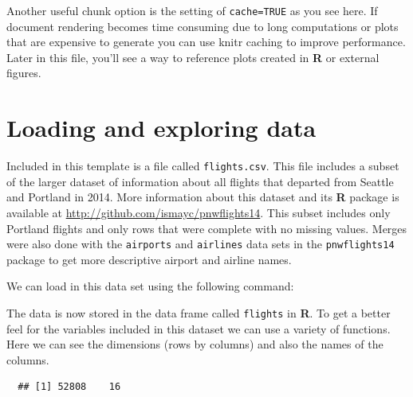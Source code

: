 \documentclass[12pt,twoside]{reedthesis}
\theoremstyle{definition}
\theoremstyle{definition}
\theoremstyle{remark}
\begin{document}
  Another useful chunk option is the setting of \texttt{cache=TRUE} as you
  see here. If document rendering becomes time consuming due to long
  computations or plots that are expensive to generate you can use knitr
  caching to improve performance. Later in this file, you'll see a way to
  reference plots created in \textbf{R} or external figures.
  
  \hypertarget{loading-and-exploring-data}{\section{Loading and exploring
  data}\label{loading-and-exploring-data}}
  
  Included in this template is a file called \texttt{flights.csv}. This
  file includes a subset of the larger dataset of information about all
  flights that departed from Seattle and Portland in 2014. More
  information about this dataset and its \textbf{R} package is available
  at \url{http://github.com/ismayc/pnwflights14}. This subset includes
  only Portland flights and only rows that were complete with no missing
  values. Merges were also done with the \texttt{airports} and
  \texttt{airlines} data sets in the \texttt{pnwflights14} package to get
  more descriptive airport and airline names.
  
  We can load in this data set using the following command:
  
  \begin{Shaded}
  \begin{Highlighting}[]
  \StringTok{ }\NormalTok{(}\NormalTok{)}
  \end{Highlighting}
  \end{Shaded}
  
  The data is now stored in the data frame called \texttt{flights} in
  \textbf{R}. To get a better feel for the variables included in this
  dataset we can use a variety of functions. Here we can see the
  dimensions (rows by columns) and also the names of the columns.
  
  \begin{Shaded}
  \begin{Highlighting}[]
  \end{Highlighting}
  \end{Shaded}
  
  \begin{verbatim}
  ## [1] 52808    16
  \end{verbatim}
  
\end{document}
